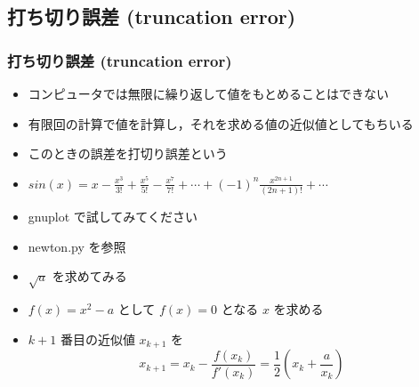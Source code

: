\subsection{打ち切り誤差 (truncation error)}
\begin{frame}[shrink]
\frametitle{打ち切り誤差 (truncation error)}
  \begin{itemize}
\item コンピュータでは無限に繰り返して値をもとめることはできない
\item 有限回の計算で値を計算し，それを求める値の近似値としてもちいる
\item このときの誤差を打切り誤差という
  \end{itemize}
  \begin{example}
    \begin{itemize}
\item \(sin(x)=x-\frac{x^3}{3!}+\frac{x^5}{5!}-\frac{x^7}{7!}+\cdots+(-1)^{n}\frac{x^{2n+1}}{(2n+1)!}+\cdots\)
\item gnuplot で試してみてください
    \end{itemize}
  \end{example}
  \begin{example}[平方の計算]
    \begin{itemize}
\item newton.py を参照
\item \(\sqrt{a}\) を求めてみる
\item \(f(x)=x^2-a\) として \(f(x)=0\) となる $x$ を求める
\item \(k+1\) 番目の近似値 \(x_{k+1}\) を
      \begin{displaymath}
x_{k+1} = x_k-\frac{f(x_k)}{f'(x_k)} = \frac{1}{2}(x_k+\frac{a}{x_k})
      \end{displaymath}
    \end{itemize}
  \end{example}
\end{frame}
